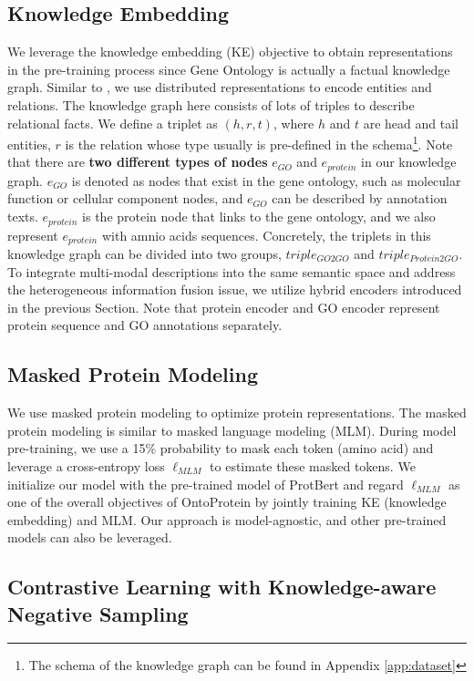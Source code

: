 \subsection{Knowledge Embedding}
 \label{sec:KE}
 {\color{highlight} We leverage the knowledge embedding (KE) objective to obtain representations in the pre-training process since Gene Ontology is actually a factual knowledge graph.}
Similar to \cite{DBLP:conf/nips/BordesUGWY13}, we use distributed representations to encode entities and relations. 
The knowledge graph here consists of lots of triples to describe relational facts.
We define a triplet as $(h, r, t)$, where $h$ and $t$ are head and tail entities, $r$ is the relation whose type usually is pre-defined in the schema\footnote{The schema of the knowledge graph can be found in Appendix \ref{app:dataset}}.
Note that there are \textbf{two different types of nodes} $e_{GO}$ and $e_{protein}$ in our knowledge graph. 
$e_{GO}$ is denoted as nodes that exist in the gene ontology, such as molecular function or cellular component nodes, and $e_{GO}$ can be described by annotation texts.
$e_{protein}$ is the protein node that links to the gene ontology, and we also represent $e_{protein}$ with amnio acids sequences.
Concretely, the triplets in this knowledge graph can be divided into two groups, $triple_{GO2GO}$ and $triple_{Protein2GO}$.
To integrate multi-modal descriptions into the same semantic space and address the heterogeneous information fusion issue, we utilize hybrid encoders introduced in the previous Section.
Note that protein encoder and GO encoder represent protein sequence and GO annotations separately.

\subsection{Masked Protein Modeling}
\label{sec:MLM}
We use masked protein modeling to optimize protein representations.
The masked protein modeling is similar to masked language modeling (MLM).
During model pre-training, we use a 15\% probability to mask each token (amino acid) and leverage a cross-entropy loss $\ell_{MLM}$ to estimate these masked tokens.
We initialize our model with the pre-trained model of ProtBert and regard $\ell_{MLM}$ as one of the overall objectives of OntoProtein by jointly training KE (knowledge embedding) and MLM.
Our approach is model-agnostic, and other pre-trained models can also be leveraged.

\subsection{Contrastive Learning with Knowledge-aware Negative Sampling}

